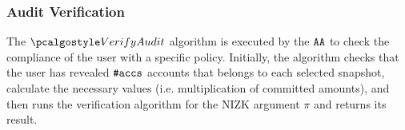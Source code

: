 \subsubsection{Audit Verification}

The $\vera$ algorithm is executed by the $\AA$ to check the compliance of the user with a specific policy.
Initially, the algorithm checks that the user has revealed $\numaccs$ accounts that belongs to each selected snapshot, calculate the necessary values (i.e. multiplication of committed amounts), and then runs the verification algorithm for the NIZK argument $\pi$ and returns its result.

